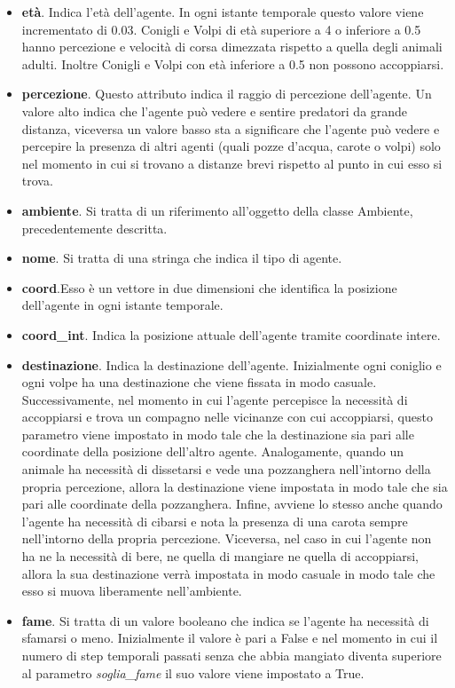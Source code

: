 \documentclass[11pt]{article}
\begin{document}
\begin{itemize}
    \item \textbf{età}. Indica l'età dell'agente. In ogni istante temporale questo valore viene incrementato di 0.03. Conigli e Volpi di età superiore a 4 o inferiore a 0.5 hanno percezione e velocità di corsa dimezzata rispetto a quella degli animali adulti. Inoltre Conigli e Volpi con età inferiore a 0.5 non possono accoppiarsi. 
    \item \textbf{percezione}. Questo attributo indica il raggio di percezione dell'agente. Un valore alto indica che l'agente può vedere e sentire predatori da grande distanza, viceversa un valore basso sta a significare che l'agente può vedere e percepire la presenza di altri agenti (quali pozze d'acqua, carote o volpi) solo nel momento in cui si trovano a distanze brevi rispetto al punto in cui esso si trova. 
    \item \textbf{ambiente}. Si tratta di un riferimento all'oggetto della classe Ambiente, precedentemente descritta. 
    \item \textbf{nome}. Si tratta di una stringa che indica il tipo di agente. 
    \item \textbf{coord}.Esso è un vettore in due dimensioni che identifica la posizione dell'agente in ogni istante temporale. 
    \item \textbf{coord\_int}. Indica la posizione attuale dell'agente tramite coordinate intere.
    \item \textbf{destinazione}. Indica la destinazione dell'agente. Inizialmente ogni coniglio e ogni volpe ha una destinazione che viene fissata in modo casuale. Successivamente, nel momento in cui l'agente percepisce la necessità di accoppiarsi e trova un compagno nelle vicinanze con cui accoppiarsi, questo parametro viene impostato in modo tale che la destinazione sia pari alle coordinate della posizione dell'altro agente. Analogamente, quando un animale ha necessità di dissetarsi e vede una pozzanghera nell'intorno della propria percezione, allora la destinazione viene impostata in modo tale che sia pari alle coordinate della pozzanghera. Infine, avviene lo stesso anche quando l'agente ha necessità di cibarsi e nota la presenza di una carota sempre nell'intorno della propria percezione. 
    Viceversa, nel caso in cui l'agente non ha ne la necessità di bere, ne quella di mangiare ne quella di accoppiarsi, allora la sua destinazione verrà impostata in modo casuale in modo tale che esso si muova liberamente nell'ambiente. 
    \item \textbf{fame}. Si tratta di un valore booleano che indica se l'agente ha necessità di sfamarsi o meno. Inizialmente il valore è pari a False e nel momento in cui il numero di step temporali passati senza che abbia mangiato diventa superiore al parametro \emph{soglia\_fame} il suo valore viene impostato a True. 

\end{itemize}
\end{document}
